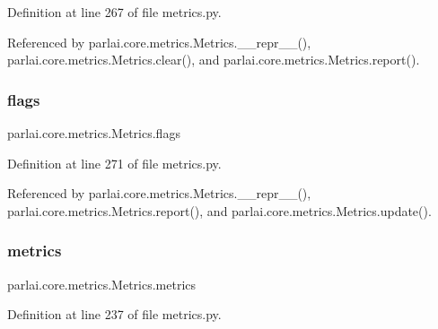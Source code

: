 Definition at line 267 of file metrics.\+py.



Referenced by parlai.\+core.\+metrics.\+Metrics.\+\_\+\+\_\+repr\+\_\+\+\_\+(), parlai.\+core.\+metrics.\+Metrics.\+clear(), and parlai.\+core.\+metrics.\+Metrics.\+report().

\mbox{\label{classparlai_1_1core_1_1metrics_1_1Metrics_a8075a929d40c06f5bbae755b98126c71}} 
\subsubsection{\texorpdfstring{flags}{flags}}
{\footnotesize\ttfamily parlai.\+core.\+metrics.\+Metrics.\+flags}



Definition at line 271 of file metrics.\+py.



Referenced by parlai.\+core.\+metrics.\+Metrics.\+\_\+\+\_\+repr\+\_\+\+\_\+(), parlai.\+core.\+metrics.\+Metrics.\+report(), and parlai.\+core.\+metrics.\+Metrics.\+update().

\mbox{\label{classparlai_1_1core_1_1metrics_1_1Metrics_ad4d95ce9a2d1fdecf7fd9ef7cf282a15}} 
\subsubsection{\texorpdfstring{metrics}{metrics}}
{\footnotesize\ttfamily parlai.\+core.\+metrics.\+Metrics.\+metrics}



Definition at line 237 of file metrics.\+py.




